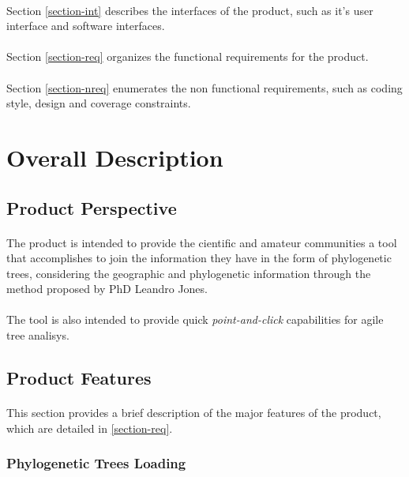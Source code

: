 \documentclass[10pt,a4paper]{article}
\begin{document}
\paragraph{}
Section \ref{section-int} describes the interfaces of the product, such as it's user interface and software interfaces.
\paragraph{}
Section \ref{section-req} organizes the functional requirements for the product. 
\paragraph{}
Section \ref{section-nreq} enumerates the non functional requirements, such as coding style, design and coverage constraints.


\section{Overall Description}
  \label{section-desc-gral}
  \subsection{Product Perspective}
\paragraph{}
The product is intended to provide the cientific and amateur communities a tool that accomplishes to join the information they have in the form of phylogenetic trees, considering the geographic and phylogenetic information through the method proposed by PhD Leandro Jones.
\paragraph{}
The tool is also intended to provide quick \emph{point-and-click} capabilities for agile tree analisys.
\subsection{Product Features}
\paragraph{}
This section provides a brief description of the major features of the product, which are detailed in \ref{section-req}.
\subsubsection{Phylogenetic Trees Loading}
\end{document}
